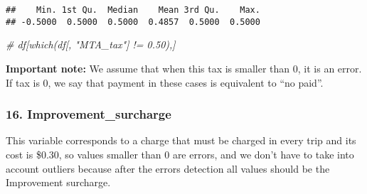 \documentclass[
  18pt,
  a4paper]{article}
\newenvironment{Shaded}{\begin{snugshade}}{\end{snugshade}}
\newcommand{\CommentTok}[1]{\textcolor[rgb]{0.56,0.35,0.01}{\textit{#1}}}
\newcommand{\DecValTok}[1]{\textcolor[rgb]{0.00,0.00,0.81}{#1}}
\newcommand{\KeywordTok}[1]{\textcolor[rgb]{0.13,0.29,0.53}{\textbf{#1}}}
\newcommand{\NormalTok}[1]{#1}
\newcommand{\OperatorTok}[1]{\textcolor[rgb]{0.81,0.36,0.00}{\textbf{#1}}}
\newcommand{\OtherTok}[1]{\textcolor[rgb]{0.56,0.35,0.01}{#1}}
\newcommand{\StringTok}[1]{\textcolor[rgb]{0.31,0.60,0.02}{#1}}
\begin{document}
\begin{Shaded}
\end{Shaded}

\begin{verbatim}
##    Min. 1st Qu.  Median    Mean 3rd Qu.    Max. 
## -0.5000  0.5000  0.5000  0.4857  0.5000  0.5000
\end{verbatim}

\begin{Shaded}
\begin{Highlighting}[]
\CommentTok{# df[which(df[, "MTA_tax"] != 0.50),]}
\end{Highlighting}
\end{Shaded}

\textbf{Important note:} We assume that when this tax is smaller than 0,
it is an error. If tax is 0, we say that payment in these cases is
equivalent to ``no paid''.

\begin{Shaded}
\end{Shaded}

\hypertarget{improvement_surcharge}{%
\subsubsection{16. Improvement\_surcharge}\label{improvement_surcharge}}

This variable corresponds to a charge that must be charged in every trip
and its cost is \$0.30, so values smaller than 0 are errors, and we
don't have to take into account outliers because after the errors
detection all values should be the Improvement surcharge.

\begin{Shaded}
\end{Shaded}
\end{document}
